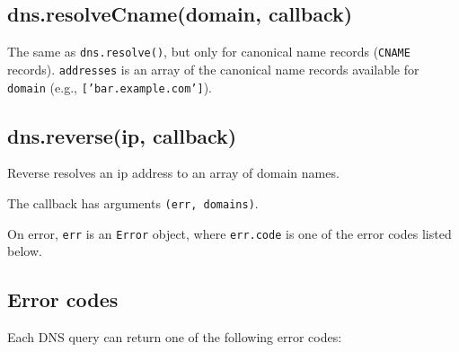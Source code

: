 \subsection{dns.resolveCname(domain, callback)}

The same as \texttt{dns.resolve()}, but only for canonical name records
(\texttt{CNAME} records). \texttt{addresses} is an array of the
canonical name records available for \texttt{domain} (e.g.,
\texttt{{[}'bar.example.com'{]}}).

\subsection{dns.reverse(ip, callback)}

Reverse resolves an ip address to an array of domain names.

The callback has arguments \texttt{(err, domains)}.

On error, \texttt{err} is an \texttt{Error} object, where
\texttt{err.code} is one of the error codes listed below.

\subsection{Error codes}

Each DNS query can return one of the following error codes:

